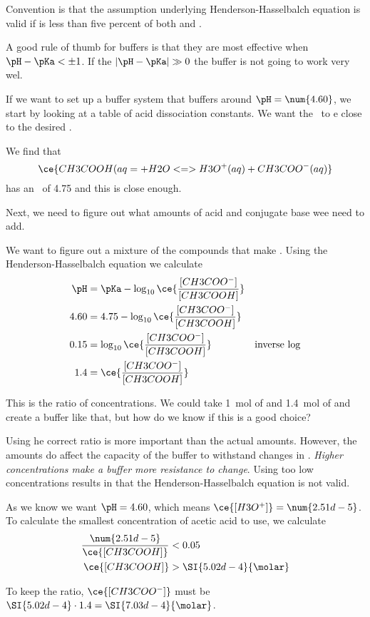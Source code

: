 \documentclass[../mit-general-chemistry.tex]{subfiles}
\begin{document}
Convention is that the assumption underlying Henderson-Hasselbalch
equation is valid if \ceinl{[H3O^+]} is less than five percent of both
\ceinl{[HA]} and \ceinl{[A^-]}.

\begin{remark}
  A good rule of thumb for buffers is that they are most effective when
  $\pH - \pKa < \pm 1$. If the $|\pH - \pKa| \gg 0$ the buffer is not
  going to work very wel.
\end{remark}



\begin{example}
  If we want to set up a buffer system that buffers around $\pH =
  \num{4.60}$, we start by looking at a table of acid dissociation
  constants. We want the \pKa\ to e close to the desired \pH.

  We find that
  \begin{equation*}
    \ce{CH3COOH(aq= + H2O <=> H3O^+(aq) + CH3COO^-(aq)}
  \end{equation*}
  has an \pKa\ of \num{4.75} and this is close enough.

  Next, we need to figure out what amounts of acid and conjugate base
  wee need to add.

  We want to figure out a mixture of the compounds that make
  . Using the Henderson-Hasselbalch
  equation we calculate
  \begin{align*}
    \pH &= \pKa - \log_{10}\ce{\frac{[CH3COO^-]}{[CH3COOH]}} \\
    4.60 &= 4.75 - \log_{10}\ce{\frac{[CH3COO^-]}{[CH3COOH]}} \\
    0.15 &= \log_{10}\ce{\frac{[CH3COO^-]}{[CH3COOH]}} &\text{inverse log} \\
    1.4 &= \ce{\frac{[CH3COO^-]}{[CH3COOH]}} \\
  \end{align*}

  This is the ratio of concentrations. We could take \SI{1}{\mol} of
   and \SI{1.4}{\mol} of  and create a buffer
  like that, but how do we know if this is a good choice?

  Using he correct ratio is more important than the actual
  amounts. However, the amounts do affect the capacity of the buffer
  to withstand changes in \pH. {\em Higher concentrations make a
    buffer more resistance to change}. Using too low concentrations
  results in that the Henderson-Hasselbalch equation is not valid.

  As we know we want $\pH = 4.60$, which means $\ce{[H3O^+]} =
  \num{2.51d-5}$. To calculate the smallest concentration of acetic
  acid to use, we calculate
  \begin{align*}
    \frac{\num{2.51d-5}}{\ce{[CH3COOH]}} &< 0.05 \\
    \ce{[CH3COOH]} &> \SI{5.02d-4}{\molar} \\
  \end{align*}

  To keep the ratio, $\ce{[CH3COO^-]}$ must be $\SI{5.02d-4} \cdot
  1.4 = \SI{7.03d-4}{\molar}$.
\end{example}
\end{document}
